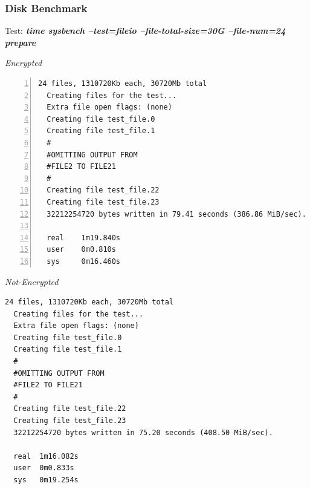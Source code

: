 \subsubsection{Disk Benchmark}
\begin{center}
  Test: \textbf{\textit{time sysbench --test=fileio --file-total-size=30G --file-num=24 prepare}}  
\end{center}
\vspace*{-\baselineskip}
\noindent\begin{minipage}[t]{0.45\linewidth}
  \centering
  \textit{Encrypted}
  \begin{lstlisting}[basicstyle=\tiny,frame=single, numbers=left, label=cpu_test1]
  24 files, 1310720Kb each, 30720Mb total
  Creating files for the test...
  Extra file open flags: (none)
  Creating file test_file.0
  Creating file test_file.1
  #
  #OMITTING OUTPUT FROM
  #FILE2 TO FILE21
  #
  Creating file test_file.22
  Creating file test_file.23
  32212254720 bytes written in 79.41 seconds (386.86 MiB/sec).
  
  real    1m19.840s
  user    0m0.810s
  sys     0m16.460s
  \end{lstlisting}
\end{minipage}
\hspace{0.5cm}
\noindent\begin{minipage}[t]{0.45\linewidth}
  \centering
  \textit{Not-Encrypted}
  \begin{lstlisting}[basicstyle=\tiny,frame=single, label=cpu_test2]
  24 files, 1310720Kb each, 30720Mb total
  Creating files for the test...
  Extra file open flags: (none)
  Creating file test_file.0
  Creating file test_file.1
  #
  #OMITTING OUTPUT FROM
  #FILE2 TO FILE21
  #
  Creating file test_file.22
  Creating file test_file.23
  32212254720 bytes written in 75.20 seconds (408.50 MiB/sec).
  
  real	1m16.082s
  user	0m0.833s
  sys	0m19.254s    
  \end{lstlisting}
\end{minipage}

